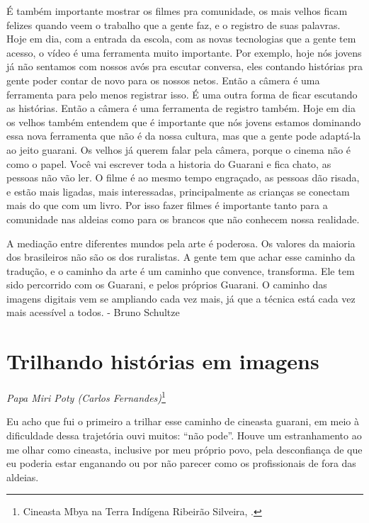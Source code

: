 É também importante mostrar os filmes pra comunidade, os mais velhos
ficam felizes quando veem o trabalho que a gente faz, e o registro de
suas palavras. Hoje em dia, com a entrada da escola, com as novas
tecnologias que a gente tem acesso, o vídeo é uma ferramenta muito
importante. Por exemplo, hoje nós jovens já não sentamos com nossos
avós pra escutar conversa, eles contando histórias pra gente poder
contar de novo para os nossos netos. Então a câmera é uma ferramenta
para pelo menos registrar isso. É uma outra forma de ficar escutando as
histórias. Então a câmera é uma ferramenta de registro também. Hoje em
dia os velhos também entendem que é importante que nós jovens estamos
dominando essa nova ferramenta que não é da nossa cultura, mas que a
gente pode adaptá-la ao jeito guarani. Os velhos já querem falar pela
câmera, porque o cinema não é como o papel. Você vai escrever toda a
historia do Guarani e fica chato, as pessoas não vão ler. O filme é ao
mesmo tempo engraçado, as pessoas dão risada, e estão mais ligadas,
mais interessadas, principalmente as crianças se conectam mais do que
com um livro. Por isso fazer filmes é importante tanto para a
comunidade nas aldeias como para os brancos que não conhecem nossa
realidade.

A mediação entre diferentes mundos pela arte é poderosa. Os valores da
maioria dos brasileiros não são os dos ruralistas. A gente tem que
achar esse caminho da tradução, e o caminho da arte é um caminho que
convence, transforma. Ele tem sido percorrido com os Guarani, e pelos
próprios Guarani. O caminho das imagens digitais vem se ampliando cada
vez mais, já que a técnica está cada vez mais acessível a todos. -
Bruno Schultze 

\chapter{Trilhando histórias em imagens}
\begin{flushright}
\emph{Papa Miri Poty (Carlos Fernandes)}\footnote{Cineasta Mbya
na Terra Indígena Ribeirão Silveira, .}
\end{flushright}
\medskip

Eu acho que fui o primeiro a trilhar esse caminho de cineasta guarani,
em meio à dificuldade dessa trajetória ouvi muitos: ``não pode''. Houve
um estranhamento ao me olhar como cineasta, inclusive por meu próprio
povo, pela desconfiança de que eu poderia estar enganando ou por não
parecer como os profissionais de fora das aldeias.


